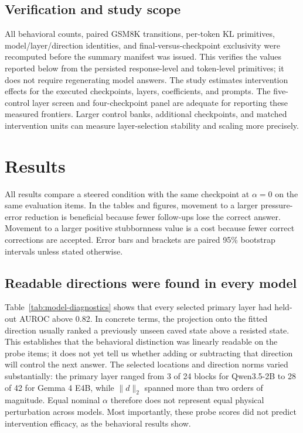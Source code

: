 \documentclass[11pt]{article}
\begin{document}
\subsection{Verification and study scope}

All behavioral counts, paired GSM8K transitions, per-token KL primitives,
model/layer/direction identities, and final-versus-checkpoint exclusivity were
recomputed before the summary manifest was issued. This verifies the values
reported below from the persisted response-level and token-level primitives;
it does not require regenerating model answers. The study estimates intervention
effects for the executed checkpoints, layers, coefficients, and prompts. The
five-control layer screen and four-checkpoint panel are adequate for reporting
these measured frontiers. Larger control banks, additional checkpoints, and
matched intervention units can measure layer-selection stability and scaling
more precisely.

\section{Results}
\label{sec:results}

All results compare a steered condition with the same checkpoint at
$\alpha=0$ on the same evaluation items. In the tables and figures, movement to
a larger pressure-error reduction is beneficial because fewer follow-ups lose
the correct answer. Movement to a larger positive stubbornness value is a cost
because fewer correct corrections are accepted. Error bars and brackets are
paired 95\% bootstrap intervals unless stated otherwise.

\subsection{Readable directions were found in every model}
\label{sec:representation-results}

\begingroup
\setlength{\tabcolsep}{4pt}
\let\paperoriginaltable\table
\let\paperoriginalendtable\endtable
\renewenvironment{table}[1][]{\paperoriginaltable[H]}{\paperoriginalendtable}

\endgroup

Table~\ref{tab:model-diagnostics} shows that every selected primary layer had
held-out AUROC above 0.82. In concrete terms, the projection onto the fitted
direction usually ranked a previously unseen caved state above a resisted
state. This establishes that the behavioral distinction was linearly readable
on the probe items; it does not yet tell us whether adding or subtracting that
direction will control the next answer. The selected locations and direction norms varied
substantially: the primary layer ranged from 3 of 24 blocks for Qwen3.5-2B to
28 of 42 for Gemma 4 E4B, while $\lVert d\rVert_2$ spanned more than two orders
of magnitude. Equal nominal $\alpha$ therefore does not represent equal
physical perturbation across models. Most importantly, these probe scores did
not predict intervention efficacy, as the behavioral results show.
\end{document}
